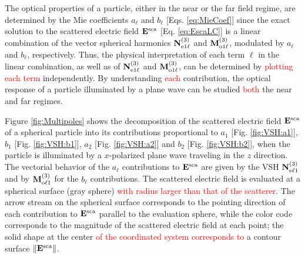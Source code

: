 
The optical properties of a particle, either in the near or the far field regime,  are determined by the Mie coefficients   $a_\ell$ and $b_\ell$ [Eqs. \eqref{eq:MieCoef}] since the exact solution to the scattered electric field $\vb{E}^\text{sca}$ [Eq. \eqref{eq:EscaLC}] is a linear combination of the vector spherical harmonics $\vb{N}^{(3)}_{\text{e}1\ell}$ and $\vb{M}^{(3)}_{\text{o}1\ell}$, modulated by  $a_\ell$ and $b_\ell$, respectively. Thus, the physical interpretation of each term $\ell$ in the linear combination, as well as of $\vb{N}^{(3)}_{\text{e}1\ell}$ and $\vb{M}^{(3)}_{\text{o}1\ell}$, can be determined by \textcolor{red}{plotting each term} independently. By understanding \textcolor{red}{each} contribution, the optical response of a particle illuminated by a plane wave can be studied \textcolor{red}{both} the near and far regimes.

Figure \ref{fig:Multipoles} shows the decomposition of the scattered electric field  $\vb{E}^\text{sca}$ of a spherical particle into its contributions proportional to $a_1$ [Fig. \ref{fig:VSH:a1}], $b_1$ [Fig. \ref{fig:VSH:b1}], $a_2$ [Fig. \ref{fig:VSH:a2}] and $b_2$ [Fig. \ref{fig:VSH:b2}], when the particle is illuminated by a $x$-polarized plane wave traveling in the $z$ direction. The vectorial behavior of the $a_\ell$ contributions to $\vb{E}^\text{sca}$ are given by the VSH $\vb{N}^{(3)}_{\text{e}\ell 1}$ and by $\vb{M}^{(3)}_{\text{o}\ell 1}$ for the $b_\ell$ contributions. The  scattered electric field  is evaluated at a spherical surface (gray sphere) \textcolor{red}{with radius larger than that of the scatterer}. The arrow stream on the spherical surface corresponds to the pointing direction of each contribution to $\vb{E}^\text{sca}$ parallel to the evaluation sphere, while the color code corresponds to the magnitude of the scattered electric field at each point; the solid shape at the center \textcolor{red}{of the coordinated system corresponds to} a contour surface $\norm{\vb{E}^\text{sca}}$.
%

